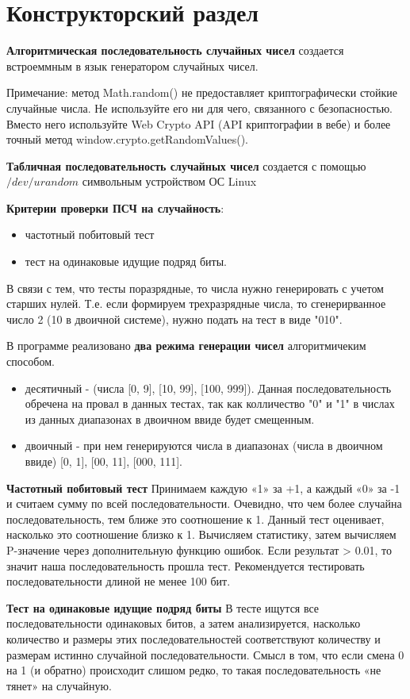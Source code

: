 \chapter{Конструкторский раздел}

\textbf{Алгоритмическая последовательность случайных чисел} создается встроеммным в язык генератором случайных чисел. 

Примечание: метод Math.random() не предоставляет криптографически стойкие случайные числа. Не используйте его ни для чего, связанного с безопасностью. Вместо него используйте Web Crypto API (API криптографии в вебе) и более точный метод window.crypto.getRandomValues().

\textbf{Табличная последовательность случайных чисел} создается с помощью $/dev/urandom$ символьным устройством ОС Linux \cite{habrahabr-hard-rand} 

\textbf{Критерии проверки ПСЧ на случайность}:
\begin{itemize}
	\item частотный побитовый тест
	\item тест на одинаковые идущие подряд биты.
\end{itemize}

В связи с тем, что тесты поразрядные, то числа нужно генерировать с учетом старших нулей. Т.е. если формируем трехразрядные числа, то сгенерирванное число 2 (10 в двоичной системе), нужно подать на тест в виде "010".  

В программе реализовано \textbf{два режима генерации чисел} алгоритмичеким способом.

\begin{itemize}
	\item десятичный - (числа [0, 9], [10, 99], [100, 999]). Данная последовательность обречена на провал в данных тестах, так как колличество "0" и "1" в числах из данных диапазонах в двоичном ввиде будет смещенным.

	\item двоичный - при нем генерируются числа в диапазонах (числа в двоичном ввиде) [0, 1], [00, 11], [000, 111].
\end{itemize}

\textbf{Частотный побитовый тест}
Принимаем каждую «1» за +1, а каждый «0» за -1 и считаем сумму по всей последовательности.
Очевидно, что чем более случайна последовательность, тем ближе это соотношение к 1. Данный тест оценивает, насколько это соотношение близко к 1. Вычисляем статистику, затем вычисляем P-значение через дополнительную функцию ошибок. Если результат > 0.01, то значит наша последовательность прошла тест. Рекомендуется тестировать последовательности длиной не менее 100 бит. \cite{habrahabr-nist} 

\textbf{Тест на одинаковые идущие подряд биты}
В тесте ищутся все последовательности одинаковых битов, а затем анализируется, насколько количество и размеры этих последовательностей соответствуют количеству и размерам истинно случайной последовательности. Смысл в том, что если смена 0 на 1 (и обратно) происходит слишом редко, то такая последовательность «не тянет» на случайную. \cite{habrahabr-nist} 




